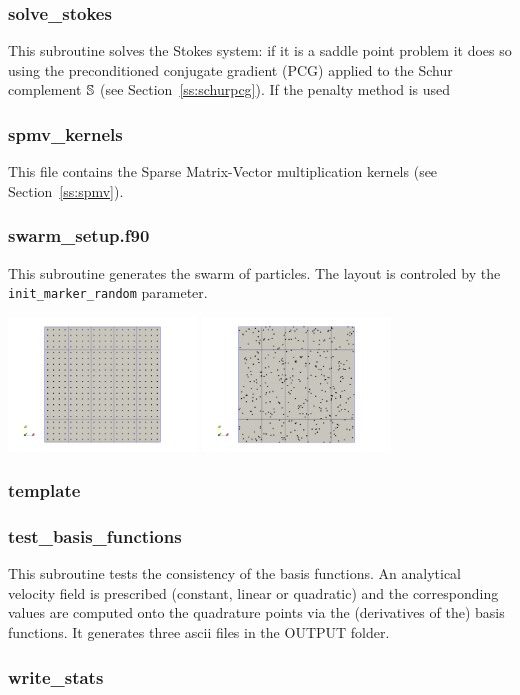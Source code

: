  \subsubsection{solve\_stokes}
 This subroutine solves the Stokes system: if it is a saddle point problem 
 it does so using the preconditioned conjugate gradient (PCG) applied 
 to the Schur complement ${\mathbb{S}}$  (see Section~\ref{ss:schurpcg}).
 If the penalty method is used 
 \subsubsection{spmv\_kernels}
 This file contains the Sparse Matrix-Vector multiplication kernels (see Section~\ref{ss:spmv}).
 \subsubsection{swarm\_setup.f90}
 This subroutine generates the swarm of particles. The layout is controled 
 by the {\tt init\_marker\_random} parameter.
 \begin{center}
 \includegraphics[width=5cm]{ELEFANT/images/swarm_reg} 
 \includegraphics[width=5cm]{ELEFANT/images/swarm_rand} 
 \end{center}
 \subsubsection{template}

 \subsubsection{test\_basis\_functions}
 This subroutine tests the consistency of the basis functions. 
 An analytical velocity field is prescribed (constant, linear or quadratic) and the 
 corresponding values are computed onto the quadrature points via the 
 (derivatives of the) basis functions.
 It generates three ascii files in the {\foldernamefont OUTPUT} folder.
 \subsubsection{write\_stats}


